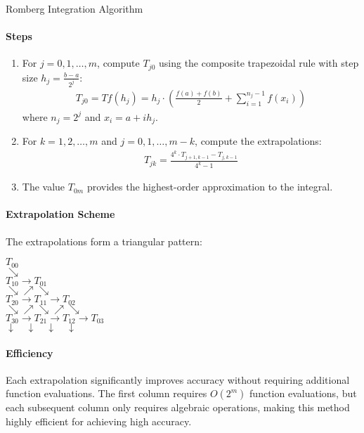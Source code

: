 \begin{KR}{Romberg Integration Algorithm}\\
\paragraph{Steps}
\begin{enumerate}
    \item For $j = 0, 1, \ldots, m$, compute $T_{j0}$ using the composite trapezoidal rule with step size $h_j = \frac{b-a}{2^j}$:
    \begin{align*}
    T_{j0} = Tf(h_j) = h_j \cdot \left(\frac{f(a) + f(b)}{2} + \sum_{i=1}^{n_j-1} f(x_i)\right)
    \end{align*}
    where $n_j = 2^j$ and $x_i = a + ih_j$.
    
    \item For $k = 1, 2, \ldots, m$ and $j = 0, 1, \ldots, m-k$, compute the extrapolations:
    \begin{align*}
    T_{jk} = \frac{4^k \cdot T_{j+1,k-1} - T_{j,k-1}}{4^k - 1}
    \end{align*}
    
    \item The value $T_{0m}$ provides the highest-order approximation to the integral.
\end{enumerate}

\paragraph{Extrapolation Scheme}
The extrapolations form a triangular pattern:
\begin{center}
$T_{00}$ \\
$\searrow$ \\
$T_{10} \rightarrow T_{01}$ \\
$\searrow \nearrow \searrow$ \\
$T_{20} \rightarrow T_{11} \rightarrow T_{02}$ \\
$\searrow \nearrow \searrow \nearrow \searrow$ \\
$T_{30} \rightarrow T_{21} \rightarrow T_{12} \rightarrow T_{03}$ \\
$\downarrow \quad \downarrow \quad \downarrow \quad \downarrow$ \\
\end{center}

\paragraph{Efficiency}
Each extrapolation significantly improves accuracy without requiring additional function evaluations. The first column requires $O(2^m)$ function evaluations, but each subsequent column only requires algebraic operations, making this method highly efficient for achieving high accuracy.
\end{KR}

